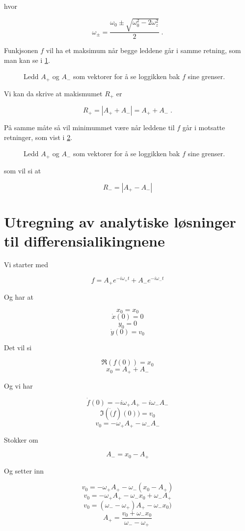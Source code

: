 \documentclass[reprint,english,notitlepage, nofootinbib]{revtex4-1}  %
\begin{document}
hvor

$$\omega_{\pm} = \frac{\omega_0 \pm \sqrt{\omega_0^2 - 2\omega_z^2}}{2} \; .$$

Funkjsonen $f$ vil ha et maksimum når begge leddene går i samme retning, som man kan se i \ref{tikzsame}. 

\begin{figure}
\scalebox{0.7}{}
\caption{Ledd $A_+$ og $A_-$ som vektorer for å se loggikken bak $f$ sine grenser.}
\label{tikzsame}
\end{figure}

Vi kan da skrive at makismumet $R_+$ er

$$R_+ = |A_+ + A_-| = A_+ + A_- \; .$$

På samme måte så vil minimummet være når leddene til $f$ går i motsatte retninger, som vist i \ref{tikzops}. 

\begin{figure}
\centering
\scalebox{0.7}{}
\caption{Ledd $A_+$ og $A_-$ som vektorer for å se loggikken bak $f$ sine grenser.}
\label{tikzops}
\end{figure}

som vil si at

$$R_- = |A_+ - A_-|$$

\section{Utregning av analytiske løsninger til differensialikingnene}

Vi starter med

$$f = A_+e^{-i\omega_+t} + A_-e^{-i\omega_-t}$$

Og har at

$$x_0 = x_0$$
$$\dot{x}(0) = 0$$
$$y_0 = 0$$
$$\dot{y}(0) = v_0$$

Det vil si

$$\Re(f(0)) = x_0$$
$$x_0 = A_+ + A_-$$

Og vi har

$$\dot{f}(0) = -i\omega_+A_+ - i\omega_-A_-$$
$$\Im(\dot(f)(0)) = v_0$$
$$v_0 = -\omega_+A_+ - \omega_-A_-$$

Stokker om

$$A_- = x_0 - A_+$$

Og setter inn

$$v_0 = -\omega_+A_+-\omega_-(x_0-A_+)$$
$$v_0 = -\omega_+A_+-\omega_-x_0+\omega_-A_+$$
$$v_0 = (\omega_--\omega_+)A_+ - \omega_-x_0)$$
$$A_+ = \frac{v_0+\omega_-x_0}{\omega_--\omega_+}$$
\end{document}
